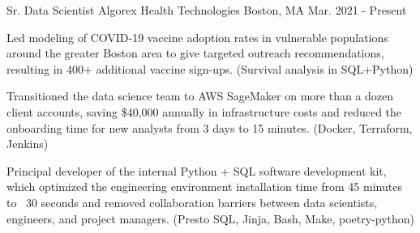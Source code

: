 

\begin{cventries}

  \cventry
    {Sr. Data Scientist} %
    {Algorex Health Technologies} %
    {Boston, MA} %
    {Mar. 2021 - Present} %
    {
      \begin{cvitems} %
      \item {
        Led modeling of COVID-19 vaccine adoption rates in vulnerable
        populations around the greater Boston area to give targeted outreach
        recommendations, resulting in 400+ additional vaccine sign-ups.
        (Survival analysis in SQL+Python)
      }
      \item {
        Transitioned the data science team to AWS SageMaker on more than a dozen
        client accounts, saving \$40,000 annually in infrastructure costs and
        reduced the onboarding time for new analysts from 3 days to 15 minutes.
        (Docker, Terraform, Jenkins)
      }
      \item {
        Principal developer of the internal Python + SQL software development
        kit, which optimized the engineering environment installation time from
        45 minutes to ~30 seconds and removed collaboration barriers between
        data scientists, engineers, and project managers. (Presto SQL, Jinja, Bash,
        Make, poetry-python)
      }
      \end{cvitems}
    }


\end{cventries}
